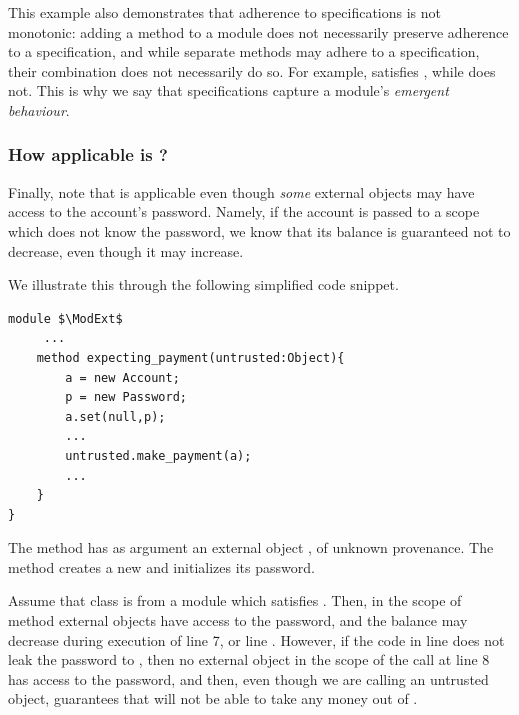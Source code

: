  This example also demonstrates that 
adherence to   \Nec specifications is not monotonic:
adding a method to a module does not necessarily preserve adherence to
a specification, 
and while separate methods may adhere to a  specification, their combination does
not necessarily do so. 
{For example, \ModA satisfies \SrobustB, while \ModB does not.}
This is why we say that \Nec   specifications capture a module's \emph{emergent behaviour}. 
 

\subsubsection{How applicable is  \SrobustB?}
\label{sec:how}
Finally,  {note that \SrobustB is applicable even though \emph{some} external objects may have access
to the account's password. 
Namely, if the account is passed to a scope which does not know the password, we 
know that its balance is guaranteed not to decrease, even though it may increase. 
}

 
We illustrate this through the following simplified code snippet.
 

\begin{lstlisting}[mathescape=true, language=chainmail, frame=lines]
module $\ModExt$
     ...
    method expecting_payment(untrusted:Object){ 
        a = new Account;
        p = new Password; 
        a.set(null,p);
        ...
        untrusted.make_payment(a);
        ...
    }
}
\end{lstlisting}
 

 The method  has as  argument an external object , of unknown provenance.
The method  creates a new  and initializes its password. 

Assume that class  is from a module which satisfies \SrobustB. 
Then, 
in the scope of  method  external objects have access to the password, 
and the balance may decrease  
during execution of  line 7, or   line . 
However, if the code in line  does not leak the password to , then no external object
in  the scope of the call  at line 8 has access to the password, and then,
even though we are calling   an untrusted object, \SrobustB guarantees that 
 will not be able to take any money out of  .
 
